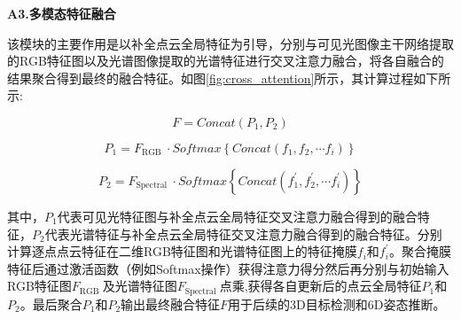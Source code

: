 \documentclass[12pt]{article}
\begin{document}

\textbf{A3.多模态特征融合}

该模块的主要作用是以补全点云全局特征为引导，分别与可见光图像主干网络提取的RGB特征图以及光谱图像提取的光谱特征进行交叉注意力融合，将各自融合的结果聚合得到最终的融合特征。如图\ref{fig:cross_attention}所示，其计算过程如下所示:

\begin{equation}
    F=Concat\left(P_{1}, P_{2}\right)
\end{equation}

\begin{equation}
    P_{1}=F_{\text {RGB }} \cdot Softmax\left\{Concat\left(f_{1}, f_{2}, \cdots f_{i}\right)\right\}
\end{equation}

\begin{equation}
    P_{2}=F_{\text {Spectral }} \cdot Softmax\left\{Concat\left(f_{1}^{\prime}, f_{2}^{\prime}, \cdots f_{i}^{\prime}\right)\right\}
\end{equation}

其中，$P_{1}$代表可见光特征图与补全点云全局特征交叉注意力融合得到的融合特征，$P_{2}$代表光谱特征与补全点云全局特征交叉注意力融合得到的融合特征。分别计算逐点点云特征在二维RGB特征图和光谱特征图上的特征掩膜$f_{i}$和$f_{i}^{\prime}$。聚合掩膜特征后通过激活函数（例如Softmax操作）获得注意力得分然后再分别与初始输入RGB特征图$F_{\text {RGB }}$及光谱特征图$F_{\text {Spectral }}$点乘,获得各自更新后的点云全局特征$P_{1}$和$P_{2}$。最后聚合$P_{1}$和$P_{2}$输出最终融合特征$F$用于后续的3D目标检测和6D姿态推断。


\end{document}
